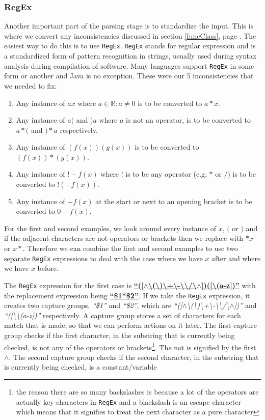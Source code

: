 \documentclass[../../../../../main.tex]{subfiles}
\begin{document}
\subsubsection{RegEx}
Another important part of the parsing stage is to standardize the input. This is where we convert any inconsistencies discussed in section \ref{funcClass}, page \pageref{funcClass}. The easiest way to do this is to use \texttt{RegEx\cite{regex}}. \texttt{RegEx} stands for regular expression and is a standardized form of pattern recognition in strings, usually used during syntax analysis during compilation of software. Many languages support \texttt{RegEx} in some form or another and Java is no exception. These were our 5 inconsistencies that we needed to fix:
\begin{enumerate}
	\item Any instance of $ax$ where $a \in  \mathbb{R} : a \neq 0$ is to be converted to $a*x$.
	\item Any instance of $a($ and $)a$ where $a$ is not an operator, is to be converted to $a*($ and $)*a$ respectively.
	\item Any instance of $(f(x))(g(x))$ is to be converted to $(f(x))*(g(x))$.
	\item Any instance of $!-f(x)$ where $!$ is to be any operator (e.g. $*$ or $/$) is to be converted to $! (-f(x))$.
	\item Any instance of $-f(x)$ at the start or next to an opening bracket is to be converted to $0 - f(x)$.
\end{enumerate}
For the first and second examples, we look around every instance of $x$, $($ or $)$ and if the adjacent characters are not operators or brackets then we replace with $*x$ or $x*$. Therefore we can combine the first and second examples to use two separate \texttt{RegEx} expressions to deal with the case where we have $x$ after and where we have $x$ before.\par
The \texttt{RegEx} expression for the first case is
\textbf{\underline{``([$\wedge$\textbackslash(\textbackslash)\textbackslash+\textbackslash-\textbackslash*\textbackslash/\textbackslash$\wedge$])([\textbackslash(a-z])''}}
with the replacement expression being \textbf{\underline{``\$1*\$2''}}. If we take the \texttt{RegEx} expression, it creates two capture groups, \textit{``\$1''} and \textit{``\$2''}, which are 
\textit{``([$\wedge$\textbackslash(\textbackslash)\textbackslash+\textbackslash-\textbackslash*\textbackslash/\textbackslash$\wedge$])''}
 and 
 \textit{``([\textbackslash\textbackslash(a-z])''} 
 respectively. A capture group stores a set of characters for each match that is made, so that we can perform actions on it later. The first capture group checks if the first character, in the substring that is currently being checked, is not any of the operators or brackets\footnote{the reason there are so many backslashes is because a lot of the operators are actually key characters in \texttt{RegEx} and a blackslash is an escape character which means that it signifies to treat the next character as a pure character}. The not is signified by the first $\wedge$. The second capture group checks if the second character, in the substring that is currently being checked, is a constant/variable
\end{document}
